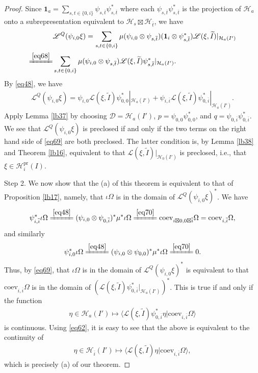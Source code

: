 \documentclass[12pt,a4paper]{article}
\theoremstyle{definition}
\theoremstyle{plain}
\newcommand{\mc}{\mathcal}
\newcommand{\wtd}{\widetilde}
\newcommand{\ovl}{\overline}
\newcommand{\id}{\mathbf{1}}
\newcommand{\coev}{\mathrm{coev}}
\newcommand{\Dom}{\scr D}
\newcommand{\bk}[1]{\langle {#1}\rangle}
\newcommand{\scr}{\mathscr}
\newcommand{\pr}{\mathrm{pr}}
\numberwithin{equation}{section}
\begin{document}
\begin{proof}
Since $\id_a=\sum_{s,t\in\{0,i\}}\psi_{s,\ovl t}\psi_{s,\ovl t}^*$ where each $\psi_{s,\ovl t}\psi_{s,\ovl t}^*$ is the projection of $\mc H_a$ onto a subrepresentation equivalent to $\mc H_s\boxtimes\mc H_{\ovl t}$, we have
\begin{align*}
&\scr L^Q(\psi_{i,0}\xi)=\sum_{s,t\in\{0,i\}}\mu(\psi_{i,0}\otimes\psi_{s,\ovl t})(\id_i\otimes\psi_{s,\ovl t}^*)\scr L(\xi,\wtd I)|_{\mc H_a(I')}\\
\xlongequal{\eqref{eq68}}&	\sum_{s,t\in\{0,i\}}\mu(\psi_{i,0}\otimes\psi_{s,\ovl t})\scr L(\xi,\wtd I)\psi_{s,\ovl t}^*|_{\mc H_a(I')}.
\end{align*}
By \eqref{eq48}, we have 
\begin{align}
\scr L^Q(\psi_{i,0}\xi)=\psi_{i,0}\scr L(\xi,\wtd I)\psi_{0,0}^*|_{\mc H_a(I')}+\psi_{i,\ovl i}\scr L(\xi,\wtd I)\psi_{0,\ovl i}^*|_{\mc H_a(I')}.\label{eq69}
\end{align}
Apply Lemma \ref{lb37} by choosing  $\Dom=\mc H_a(I')$, $p=\psi_{0,0}\psi_{0,0}^*$, and $q=\psi_{0,\ovl i}\psi_{0,\ovl i}^*$. We see that $\scr L^Q(\psi_{i,0}\xi)$ is preclosed if and only if the two terms on the right hand side of \eqref{eq69} are both preclosed. The latter condition is, by Lemma \ref{lb38} and Theorem \ref{lb16}, equivalent to that $\scr L(\xi,\wtd I)|_{\mc H_0(I')}$ is preclosed, i.e., that $\xi\in\mc H_i^\pr(I)$. 

Step 2. We now show that the (a) of this theorem is equivalent to that of Proposition \ref{lb17}, namely, that $\iota\Omega$ is in the domain of $\scr L^Q(\psi_{i,0}\xi)^*$. We have
\begin{align}
\psi_{i,\ovl i}^*\iota\Omega\xlongequal{\eqref{eq48}}(\psi_{i,0}\otimes\psi_{0,\ovl i})^*\mu^*\iota\Omega\xlongequal{\eqref{eq70}} \coev_{i\boxtimes 0,0\boxtimes\ovl i}\Omega=\coev_{i,\ovl i}\Omega,\label{eq71}
\end{align}
and similarly
\begin{align}
\psi_{i,0}^*\iota\Omega\xlongequal{\eqref{eq48}}(\psi_{i,0}\otimes\psi_{0,0})^*\mu^*\iota\Omega\xlongequal{\eqref{eq70}} 0.\label{eq72}
\end{align}
Thus, by \eqref{eq69}, that $\iota\Omega$ is in the domain of $\scr L^Q(\psi_{i,0}\xi)^*$ is equivalent to that $\coev_{i,\ovl i}\Omega$ is in the domain of $(\scr L(\xi,\wtd I)\psi_{0,\ovl i}^*|_{\mc H_a(I')})^*$. This is true if and only if the function
\begin{align*}
	\eta\in\mc H_a(I')\mapsto \bk{\scr L(\xi,\wtd I)\psi_{0,\ovl i}^*\eta|\coev_{i,\ovl i}\Omega}
\end{align*}
is continuous. Using \eqref{eq62}, it is easy to see that the above is equivalent to the continuity of 
\begin{align*}
	\eta\in\mc H_{\ovl i}(I')\mapsto \bk{\scr L(\xi,\wtd I)\eta|\coev_{i,\ovl i}\Omega},
\end{align*}
which is precisely (a) of our theorem. 


\end{proof}
\end{document}
